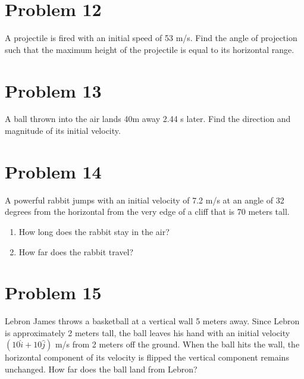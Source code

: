 \documentclass[tikz,border=10pt]{article}
\begin{document}
\section*{Problem 12}
A projectile is fired with an initial speed of 53 m/s. Find the angle of projection such that the maximum height of the projectile is equal to its horizontal range.

\section*{Problem 13}
A ball thrown into the air lands 40m away 2.44 s later. Find the direction and magnitude of its initial velocity.

\section*{Problem 14}
A powerful rabbit jumps with an initial velocity of 7.2 m/s at an angle of 32 degrees from the horizontal from the very edge of a cliff that is 70 meters tall. 
\begin{enumerate}
    \item How long does the rabbit stay in the air?
    \item How far does the rabbit travel?
\end{enumerate}

\section*{Problem 15}
Lebron James throws a basketball at a vertical wall 5 meters away. Since Lebron is approximately 2 meters tall, the ball leaves his hand with an initial velocity $(10\hat{i} + 10\hat{j})$ m/s from 2 meters off the ground. When the ball hits the wall, the horizontal component of its velocity is flipped the vertical component remains unchanged. How far does the ball land from Lebron?
\end{document}
